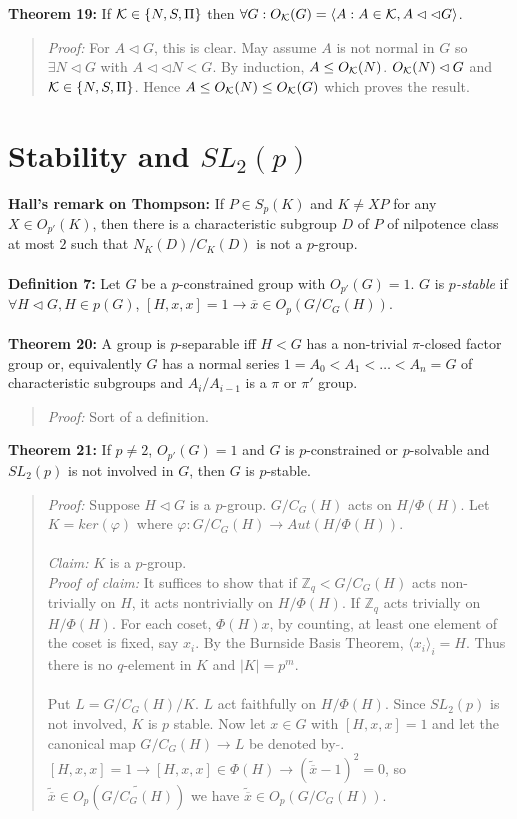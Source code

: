 {\bf Theorem 19:} If ${\cal K} \in  \{N, S, \Pi\}$ then 
$\forall G: O_{\cal K}(G)= \langle A: A \in {\cal K}, A \lhd \lhd G \rangle $.
\begin{quote}
\emph{Proof:}  
For $A \lhd G$, this is clear.  May assume $A$ is not normal in $G$ so $\exists N \lhd G$ with
$A \lhd \lhd N<G$.  By induction, 
$A \leq O_{\cal K}(N)$.  
$O_{\cal K}(N) \lhd G$ and  ${\cal K} \in \{N , S , \Pi \}$.  Hence $A \leq O_{\cal K}(N) \leq O_{\cal K}(G)$ which
proves the result.
\end{quote}
\section{Stability and $SL_2(p)$}
{\bf Hall's remark on Thompson:}  If $P \in S_p(K)$ and $K \ne XP$ for any $X \in O_{p'}(K)$, then
there is a characteristic subgroup $D$ of $P$ of nilpotence class at most $2$ such that
$N_K(D)/C_K(D)$ is not a $p$-group.
\\
\\
{\bf Definition 7:}  Let $G$ be a $p$-constrained group with $O_{p'}(G)=1$.
$G$ is $p$\emph{-stable} if $\forall H \lhd G, H \in p(G)$,
$[H,x,x]=1 \rightarrow {\overline x} \in O_p(G/C_G(H))$.
\\
\\
{\bf Theorem 20:}
A group is $p$-separable iff
$H<G$ has a non-trivial $\pi$-closed factor group or, equivalently
$G$ has a normal series $1= A_0 < A_1 < \ldots <A_n=G$ of characteristic
subgroups and $A_i/A_{i-1}$ is a $\pi$ or $\pi'$ group.
\begin{quote}
\emph{Proof:}  Sort of a definition.
\end{quote}
{\bf Theorem 21:}
If $p \ne 2$, $O_{p'}(G)=1$ and $G$ is $p$-constrained or $p$-solvable and $SL_2(p)$ is
not involved in $G$, then $G$ is $p$-stable.
\begin{quote}
\emph{Proof:}
Suppose $H \lhd G$ is a $p$-group.  $G/C_G(H)$ acts on $H/\Phi(H)$.  Let $K=ker(\varphi)$
where $\varphi: G/C_G(H) \rightarrow Aut(H/\Phi(H))$.
\\
\\
\emph{Claim:} $K$ is a $p$-group.
\\
\emph{Proof of claim:} It suffices to show that if
${\mathbb Z}_q < G/C_G(H)$ acts non-trivially on $H$, it acts nontrivially on
$H/\Phi(H)$.  If ${\mathbb Z}_q$ acts trivially on $H/\Phi(H)$.  For each coset,
$\Phi(H)x$, by counting, at least one element of the coset is fixed, say $x_i$.
By the Burnside Basis Theorem, $ \langle x_i \rangle_i = H$.  
Thus there is no $q$-element in $K$ and
$|K|=p^m$.
\\
\\
Put $L= G/C_G(H)/K$.  $L$ act faithfully on $H/\Phi(H)$.  Since $SL_2(p)$ is not involved,
$K$ is $p$ stable.  Now let $x \in G$ with $[H,x,x]=1$ and let the canonical map
$G/C_G(H) \rightarrow L$ be denoted by $\tilde {}$.  
$[H,x,x]=1 \rightarrow [H,x,x] \in \Phi(H) \rightarrow
(\tilde {\overline x}-1)^2=0$, so
$\tilde {\overline x} \in O_p(\tilde{G/C_G(H)})$ we have
$\tilde {\overline x} \in O_p(G/C_G(H))$.
\end{quote}
